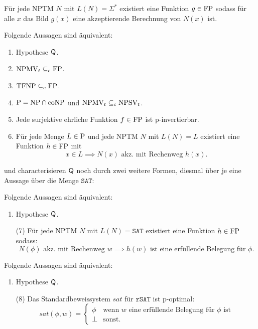 
\begin{conjecture}
    Für jede NPTM $N$ mit $L(N)=\Sigma^*$ existiert eine Funktion $g\in\FP$ sodass für alle $x$ das Bild $g(x)$ eine akzeptierende Berechnung von $N(x)$ ist. 
\end{conjecture}

\begin{theorem}\label{thm:q-orig}
    Folgende Aussagen sind äquivalent:
    \begin{enumerate}
        \item Hypothese $\hQ$.
        \item $\mathrm{NPMV}_t\subseteqc \mathrm{FP}$.
        \item $\TFNP\subseteqc \mathrm{FP}$.
        \item $\P=\NP\cap\coNP$ und $\mathrm{NPMV}_t\subseteqc \mathrm{NPSV}_t$.
        \item Jede surjektive ehrliche Funktion $f\in\FP$ ist p-invertierbar. %
        \item Für jede Menge $L\in \P$  und jede NPTM $N$ mit $L(N)=L$ existiert eine Funktion $h\in \FP$ mit 
            \[ x\in L \implies N(x) \text{ akz. mit Rechenweg $h(x)$}. \]
    \end{enumerate}
\end{theorem}

\textcite{fenner_inverting_2003} und \textcite{messner_simulation_2001} characterisieren $\hQ$ noch durch zwei weitere Formen, diesmal über je eine Aussage über die Menge $\mathtt{SAT}$:
\begin{theorem}\label{thm:q-fenner}
    Folgende Aussagen sind äquivalent:
    \begin{enumerate}
        \item Hypothese $\hQ$.
        \item[(7)] Für jede NPTM $N$ mit $L(N)=\mathtt{SAT}$ existiert eine Funktion $h\in \FP$ sodass:
            \[ N(\phi) \text{ akz. mit Rechenweg $w$} \implies \text{$h(w)$ ist eine erfüllende Belegung für $\phi$.} \]
    \end{enumerate}
\end{theorem}
\begin{theorem}
    Folgende Aussagen sind äquivalent:
    \begin{enumerate}
        \item Hypothese $\hQ$.
        \item[(8)] Das Standardbeweissystem $\mathit{sat}$ für $\mathtt{rSAT}$ ist p-optimal:
            \[ \mathit{sat}(\phi, w) = \begin{cases} \phi & \text{wenn $w$ eine erfüllende Belegung für $\phi$ ist} \\ \bot & \text{sonst.} \end{cases}\]
    \end{enumerate}
\end{theorem}

